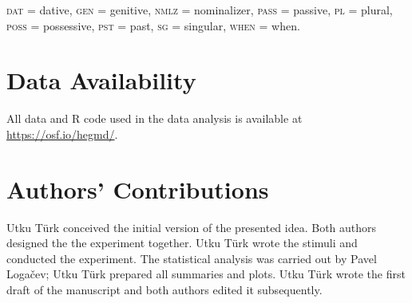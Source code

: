 \documentclass[apacite,linguex]{glossa}\usepackage[]{graphicx}\usepackage[]{color}
\newcommand{\firstauthor}{{Utku T\"urk}}
\newcommand{\secondauthor}{{Pavel Loga\v{c}ev}}
\begin{document}
\textsc{dat} = dative, \textsc{gen} = genitive, \textsc{nmlz} = nominalizer, \textsc{pass} = passive, \textsc{pl} = plural, \textsc{poss} = possessive, \textsc{pst} = past, \textsc{sg} = singular, \textsc{when} = when. %


\section*{Data Availability} %

All data and R code used in the data analysis is available at \url{https://osf.io/hegmd/}. %


\section*{Authors' Contributions} %


{\firstauthor} conceived the initial version of the presented idea. Both authors designed the the experiment together. 
{\firstauthor} wrote the stimuli and conducted the experiment. The statistical analysis was carried out by {\secondauthor}; {\firstauthor} prepared all summaries and plots. {\firstauthor} wrote the first draft of the manuscript and both authors edited it subsequently. 




\end{document}
